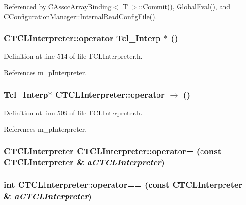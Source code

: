 Referenced by CAssoc\-Array\-Binding$<$ T $>$::Commit(), Global\-Eval(), and CConfiguration\-Manager::Internal\-Read\-Config\-File().
\subsubsection{\setlength{\rightskip}{0pt plus 5cm}CTCLInterpreter::operator Tcl\_\-Interp $\ast$ ()\hspace{0.3cm}{\tt  [inline]}}\label{classCTCLInterpreter_a44}




Definition at line 514 of file TCLInterpreter.h.

References m\_\-p\-Interpreter.
\subsubsection{\setlength{\rightskip}{0pt plus 5cm}Tcl\_\-Interp$\ast$ CTCLInterpreter::operator $\rightarrow$  ()\hspace{0.3cm}{\tt  [inline]}}\label{classCTCLInterpreter_a43}




Definition at line 509 of file TCLInterpreter.h.

References m\_\-p\-Interpreter.
\subsubsection{\setlength{\rightskip}{0pt plus 5cm}CTCLInterpreter CTCLInterpreter::operator= (const CTCLInterpreter \& {\em a\-CTCLInterpreter})\hspace{0.3cm}{\tt  [private]}}\label{classCTCLInterpreter_c1}


\subsubsection{\setlength{\rightskip}{0pt plus 5cm}int CTCLInterpreter::operator== (const CTCLInterpreter \& {\em a\-CTCLInterpreter})\hspace{0.3cm}{\tt  [inline]}}\label{classCTCLInterpreter_a3}




